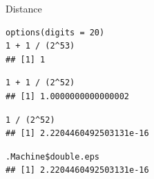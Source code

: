 \documentclass[11pt,compress,t,notes=noshow, xcolor=table]{beamer}
\begin{document}
\begin{vbframe}{Distance}
\framebreak
\lz
\begin{verbatim}
options(digits = 20)
1 + 1 / (2^53)
## [1] 1
\end{verbatim}

\vspace{0.3cm}
\begin{verbatim}
1 + 1 / (2^52)
## [1] 1.0000000000000002
\end{verbatim}

\vspace{0.3cm}
\begin{verbatim}
1 / (2^52)
## [1] 2.2204460492503131e-16
\end{verbatim}

\vspace{0.3cm}
\begin{verbatim}
.Machine$double.eps
## [1] 2.2204460492503131e-16
\end{verbatim}


\end{vbframe}

\endlecture
\end{document}
